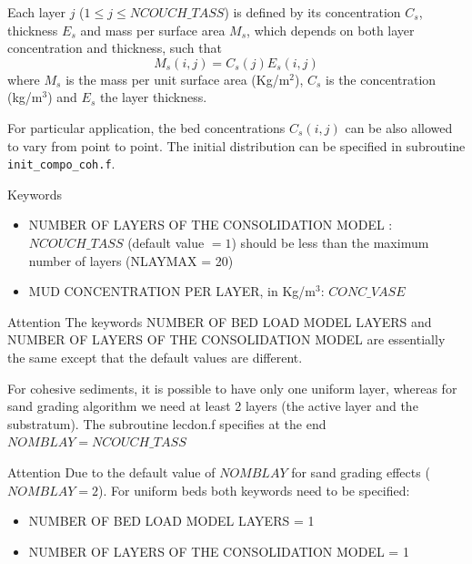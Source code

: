 Each layer $j$ ($1 \leq j \leq NCOUCH\_TASS$) is defined by its concentration $C_s$, thickness $E_s$ and mass per surface area $M_s$, 
which depends on both layer concentration and thickness, such that
\begin{equation*}
M_s(i,j) = C_s(j) E_s(i,j)
\end{equation*}
where $M_s$ is the mass per unit surface area (Kg/m$^2$), $C_s$ is the concentration (kg/m$^3$) and $E_s$ the layer thickness.

For particular application, the bed concentrations $C_s(i, j)$ can be
also allowed to vary from point to point. The initial distribution can be
specified in subroutine \texttt{init\_compo\_coh.f}. 

\medskip
\begin{bclogo}[couleur=blue!10,arrondi=0.1, logo=\bcinfo]{Keywords}
\begin{itemize}
\item {\ttfamily NUMBER OF LAYERS OF THE CONSOLIDATION MODEL} : $NCOUCH\_TASS$ (default value $= 1$)  should be less than the maximum number of layers ({\ttfamily NLAYMAX = 20})
\item {\ttfamily MUD CONCENTRATION PER LAYER}, in Kg/m$^3$: $ CONC\_VASE$
\end{itemize}
\end{bclogo}

\begin{bclogo}[couleur = blue!10, arrondi = 0.10, logo = \bcattention]{\textsf{Attention}}
The keywords {\ttfamily NUMBER OF BED LOAD MODEL LAYERS} and
{\ttfamily NUMBER OF LAYERS OF THE CONSOLIDATION MODEL} are essentially the same
except that the default values are different. 

For cohesive sediments, it is possible to have only one uniform layer, whereas for sand grading algorithm
we need at least 2 layers (the active layer and the substratum).
The subroutine {\ttfamily lecdon.f} specifies at the end $NOMBLAY = NCOUCH\_TASS$
\end{bclogo}
\begin{bclogo}[couleur = blue!10, arrondi = 0.10, logo = \bcattention]{\textsf{Attention}}
Due to the default value of $NOMBLAY$ for sand grading
effects ($NOMBLAY = 2$).
For uniform beds both keywords need to be specified:
\begin{itemize}
\item {\ttfamily NUMBER OF BED LOAD MODEL LAYERS = 1}
\item {\ttfamily NUMBER OF LAYERS OF THE CONSOLIDATION MODEL = 1}
\end{itemize}
\end{bclogo}



